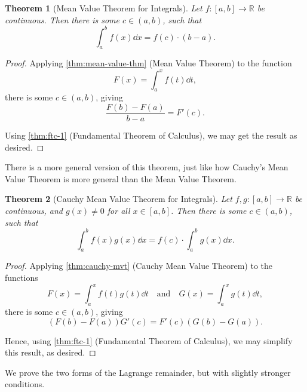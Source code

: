 \documentclass[11pt]{article}
\numberwithin{equation}{section}
\newtheorem{theorem}{Theorem}[section]
\theoremstyle{definition}
\theoremstyle{remark}
\newcommand{\pqty}[1]{\left(#1\right)}
\newcommand{\ccintv}[2]{[#1,#2]}
\newcommand{\oointv}[2]{(#1,#2)}
\newcommand{\functiondomain}[3]{#1:#2\to #3}
\newcommand{\RR}{\mathbb R}
\newcommand{\qand}{\quad\text{and}\quad}
\begin{document}
\begin{theorem}[Mean Value Theorem for Integrals]\label{analysis-unit-0176}
    \label{thm:mvt-integrals}%
    Let \(\functiondomain{f}{\ccintv{a}{b}}{\RR}\) be continuous. Then there is some \(c \in \oointv{a}{b}\), such that
    \[
        \int_{a}^{b} f\pqty{x} \dd{x} = f\pqty{c} \cdot \pqty{b - a}.
    \]
\end{theorem}

\begin{proof}
    Applying \autoref{thm:mean-value-thm} (Mean Value Theorem) to the function
    \[
        F\pqty{x} = \int_{a}^{x} f\pqty{t} \dd{t},
    \]
    there is some \(c \in \oointv{a}{b}\), giving
    \[
        \frac{F\pqty{b} - F\pqty{a}}{b - a} = F'\pqty{c}.
    \]

    Using \autoref{thm:ftc-1} (Fundamental Theorem of Calculus), we may get the result as desired.
\end{proof}

There is a more general version of this theorem, just like how Cauchy's Mean Value Theorem is more general than the Mean Value Theorem.

\begin{theorem}[Cauchy Mean Value Theorem for Integrals]\label{analysis-unit-0177}
    \label{thm:cauchy-mvt-integrals}%
    Let \(\functiondomain{f, g}{\ccintv{a}{b}}{\RR}\) be continuous, and \(g\pqty{x} \neq 0\) for all \(x \in \ccintv{a}{b}\). Then there is some \(c \in \oointv{a}{b}\), such that
    \[
        \int_{a}^{b} f\pqty{x} g\pqty{x} \dd{x} = f\pqty{c} \cdot \int_{a}^{b} g\pqty{x} \dd{x}.
    \]
\end{theorem}

\begin{proof}
    Applying \autoref{thm:cauchy-mvt} (Cauchy Mean Value Theorem) to the functions
    \[
        F\pqty{x} = \int_{a}^{x} f\pqty{t} g\pqty{t} \dd{t} \qand G\pqty{x} = \int_{a}^{x} g\pqty{t} \dd{t},
    \]
    there is some \(c \in \oointv{a}{b}\), giving
    \[
        \pqty{F\pqty{b} - F\pqty{a}} G'\pqty{c} = F'\pqty{c} \pqty{G\pqty{b} - G\pqty{a}}.
    \]

    Hence, using \autoref{thm:ftc-1} (Fundamental Theorem of Calculus), we may simplify this result, as desired.
\end{proof}

We prove the two forms of the Lagrange remainder, but with slightly stronger conditions.
\end{document}
